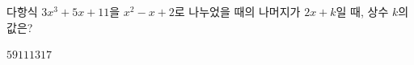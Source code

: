 다항식 $3x^3+5x+11$을 $x^2-x+2$로 나누었을 때의 나머지가 $2x+k$일 때, 상수 $k$의 값은?
\begin{choices32}{$5$}{$9$}{$11$}{$13$}{$17$}\end{choices32}
